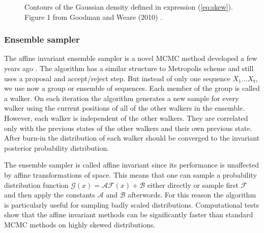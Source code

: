 \documentclass{wihuri}
\def\tstep{\mathsf{t}}
\begin{document}
\begin{figure}
\centerline{}
\caption{Contours of the Gaussian density defined in expression (\ref{eq:skew}). Figure 1 from Goodman and Weare (2010) \cite{ensemble1}.
\label{fig:skewed}}
\end{figure}


\subsubsection{Ensemble sampler}

The affine invariant ensemble sampler is a novel MCMC method developed a few years ago \cite{ensemble1}. %
The algorithm has a similar structure to Metropolis scheme and still uses a proposal and accept/reject step. But instead of only one sequence $X_{1}...X_{\tstep}$, we use now a group or ensemble of sequences. Each member of the group is called a walker. On each iteration the algorithm generates a new sample for every walker using the  current positions of all of the other walkers in
the ensemble. However, each walker is independent of the other walkers. They are correlated only with the previous states of the other walkers and their own previous state. After burn-in the distribution of each walker should be converged to the invariant posterior probability distribution.






The ensemble sampler is called affine invariant since its performance is unaffected by affine transformations of space. This means that one can sample a probability distribution function $\mathcal{G}(x) = \mathcal{A}\mathcal{F}(x) + \mathcal{B}$ either directly or sample first $\mathcal{F}$ and then apply the constants $\mathcal{A}$ and $\mathcal{B}$ afterwords. 
For this reason the algorithm is particularly useful for sampling badly scaled distributions. Computational tests show that the affine invariant methods can be significantly faster than standard MCMC methods on highly skewed distributions.
\end{document}

